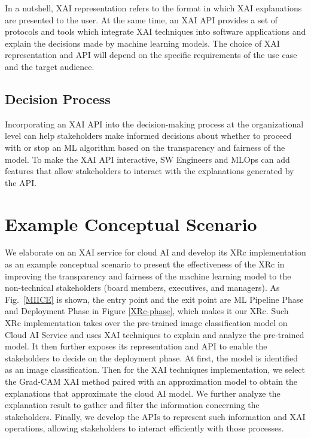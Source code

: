 \documentclass[conference]{IEEEtran}
\begin{document}
In a nutshell, XAI representation refers to the format in which XAI explanations are presented to the user. At the same time, an XAI API provides a set of protocols and tools which integrate XAI techniques into software applications and explain the decisions made by machine learning models. The choice of XAI representation and API will depend on the specific requirements of the use case and the target audience.

\subsection{Decision Process}
Incorporating an XAI API into the decision-making process at the organizational level can help stakeholders make informed decisions about whether to proceed with or stop an ML algorithm based on the transparency and fairness of the model. To make the XAI API interactive, SW Engineers and MLOps can add features that allow stakeholders to interact with the explanations generated by the API.

\section{Example Conceptual Scenario}

We elaborate on an XAI service for cloud AI and develop its XRc implementation as an example conceptual scenario to present the effectiveness of the XRc in improving the transparency and fairness of the machine learning model to the non-technical stakeholders (board members, executives, and managers).
As Fig.~\ref{MIICE} is shown, the entry point and the exit point are ML Pipeline Phase and Deployment Phase in Figure \ref{XRc-phase}, which makes it our XRc. Such XRc implementation takes over the pre-trained image classification model on Cloud AI Service and uses XAI techniques to explain and analyze the pre-trained model. It then further exposes its representation and API to enable the stakeholders to decide on the deployment phase. At first, the model is identified as an image classification. Then for the XAI techniques implementation, we select the Grad-CAM XAI method paired with an approximation model to obtain the explanations that approximate the cloud AI model. We further analyze the explanation result to gather and filter the information concerning the stakeholders. Finally, we develop the APIs to represent such information and XAI operations, allowing stakeholders to interact efficiently with those processes.
\end{document}
